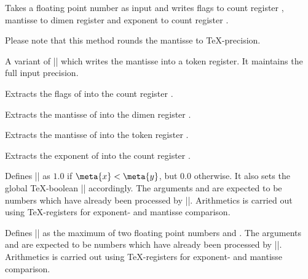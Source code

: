 \begin{command}{}
	Takes a floating point number  as input and writes flags to count
	register , mantisse to dimen register  and exponent to count
	register .

	Please note that this method rounds the mantisse to \TeX-precision.
\end{command}

\begin{command}{}
	A variant of |\pgfmathfloattoregisters| which writes the mantisse into a token register. It maintains the full input precision.
\end{command}

\begin{command}{}
	Extracts the flags of  into the count register .
\end{command}

\begin{command}{}
	Extracts the mantisse of  into the dimen register .
\end{command}
\begin{command}{}
	Extracts the mantisse of  into the token register .
\end{command}
\begin{command}{}
	Extracts the exponent of  into the count register .
\end{command}

\begin{command}{}
	Defines |\pgfmathresult| as $1.0$ if $\meta{x} < \meta{y}$, but $0.0$ otherwise. It also sets the global \TeX-boolean |\pgfmathfloatcomparison| accordingly. The arguments  and  are expected to be numbers which have already been processed by |\pgfmathfloatparsenumber|. Arithmetics is carried out using \TeX-registers for exponent- and mantisse comparison.
\end{command}

\begin{command}{}
	Defines |\pgfmathresult| as the maximum of two floating point numbers  and . The arguments  and  are expected to be numbers which have already been processed by |\pgfmathfloatparsenumber|. Arithmetics is carried out using \TeX-registers for exponent- and mantisse comparison.
\end{command}

